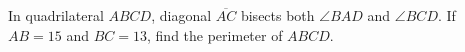 In quadrilateral $ABCD$, diagonal $\overline{AC}$ bisects both $\angle BAD$ and $\angle BCD$. If $AB=15$ and $BC=13$, find the perimeter of $ABCD$.
